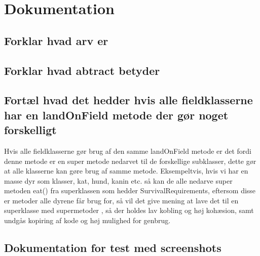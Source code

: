 \section{Dokumentation}
\subsection{Forklar hvad arv er}

\subsection{Forklar hvad abtract betyder}

\subsection{Fortæl hvad det hedder hvis alle fieldklasserne har en landOnField metode der gør noget forskelligt}
Hvis alle fieldklasserne gør brug af den samme landOnField metode er det fordi denne metode er en super metode nedarvet til de forskellige subklasser,
dette gør at alle klasserne kan gøre brug af samme metode. Eksempeltvis, hvis vi har en masse dyr som klasser, kat, hund, kanin etc. så kan de alle nedarve super metoden eat() fra 
superklassen som hedder SurvivalRequirements, eftersom disse er metoder alle dyrene får brug for, så vil det give mening at lave det til en superklasse med supermetoder
, så der holdes lav kobling og høj kohæsion, samt undgås kopiring af kode og høj mulighed for genbrug.
\subsection{Dokumentation for test med screenshots}
